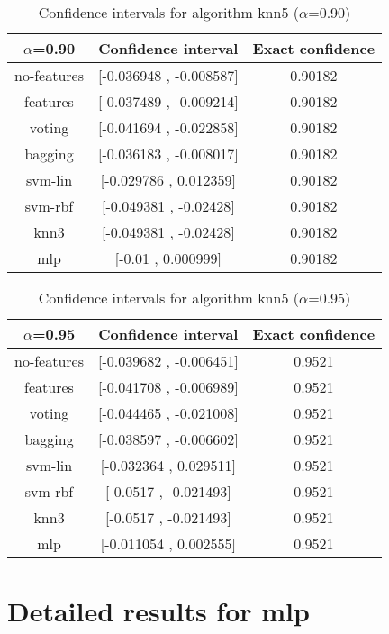 \documentclass[a4paper,10pt]{article}
\begin{document}
\begin{table}[!htp]
\centering\small
\begin{tabular}{
|c|c|c|}
\hline
 $\alpha$=0.90 & Confidence interval & Exact confidence \\ \hline 
no-features & [-0.036948 , -0.008587] & 0.90182\\ \hline 
features & [-0.037489 , -0.009214] & 0.90182\\ \hline 
voting & [-0.041694 , -0.022858] & 0.90182\\ \hline 
bagging & [-0.036183 , -0.008017] & 0.90182\\ \hline 
svm-lin & [-0.029786 , 0.012359] & 0.90182\\ \hline 
svm-rbf & [-0.049381 , -0.02428] & 0.90182\\ \hline 
knn3 & [-0.049381 , -0.02428] & 0.90182\\ \hline 
mlp & [-0.01 , 0.000999] & 0.90182\\ \hline 

\end{tabular}
\caption{Confidence intervals for algorithm knn5 ($\alpha$=0.90)}
\end{table}
\begin{table}[!htp]
\centering\small
\begin{tabular}{
|c|c|c|}
\hline
 $\alpha$=0.95 & Confidence interval & Exact confidence \\ \hline 
no-features & [-0.039682 , -0.006451] & 0.9521\\ \hline 
features & [-0.041708 , -0.006989] & 0.9521\\ \hline 
voting & [-0.044465 , -0.021008] & 0.9521\\ \hline 
bagging & [-0.038597 , -0.006602] & 0.9521\\ \hline 
svm-lin & [-0.032364 , 0.029511] & 0.9521\\ \hline 
svm-rbf & [-0.0517 , -0.021493] & 0.9521\\ \hline 
knn3 & [-0.0517 , -0.021493] & 0.9521\\ \hline 
mlp & [-0.011054 , 0.002555] & 0.9521\\ \hline 

\end{tabular}
\caption{Confidence intervals for algorithm knn5 ($\alpha$=0.95)}
\end{table}

 \clearpage 


\section{Detailed results for mlp}
\end{document}
